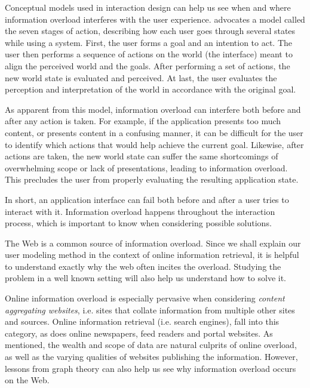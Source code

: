 Conceptual models used in interaction design can help us see when and where information overload interferes with the user experience. 
\cite{Norman1988} advocates a model called the seven stages of action, describing how each user goes through several states while using a system. 
First, the user forms a goal and an intention to act. The user then performs a sequence of actions on the world (the interface)
 meant to align the perceived world and the goals. After performing a set of actions, the new world state is evaluated and perceived. 
At last, the user evaluates the perception and interpretation of the world in accordance with the original goal.

As apparent from this model, information overload can interfere both before and after any action is taken. 
For example, if the application presents too much content, or presents content in a confusing manner, 
it can be difficult for the user to identify which actions that would help achieve the current goal. 
Likewise, after actions are taken, the new world state can suffer the same shortcomings of overwhelming scope or lack of presentations, 
leading to information overload. 
This precludes the user from properly evaluating the resulting application state. 

In short, an application interface can fail both before and after a user tries to interact with it.
Information overload happens throughout the interaction process, which is important to know when considering possible solutions.

The Web is a common source of information overload. Since we shall explain our user modeling method in the context of 
online information retrieval, it is helpful to understand exactly why the web often incites the overload. 
Studying the problem in a well known setting will also help us understand how to solve it.

Online information overload is especially pervasive when considering \emph{content aggregating websites}, 
i.e. sites that collate information from multiple other sites and sources. 
Online information retrieval (i.e. search engines), fall into this category, as does
online newspapers, feed readers and portal websites.
As mentioned, the wealth and scope of data are natural culprits of online overload, 
as well as the varying qualities of websites publishing the information. 
However, lessons from graph theory can also help us see why information overload occurs on the Web.

